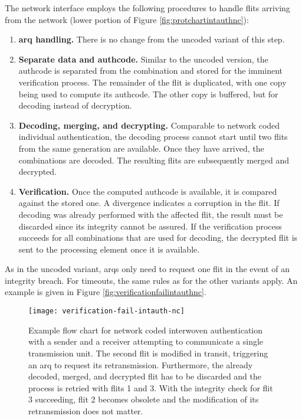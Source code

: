 The network interface employs the following procedures to handle flits arriving from the network (lower portion of Figure
\ref{fig:protchartintauthnc}):
\begin{enumerate}
    \item \textbf{\Gls{arq} handling.} There is no change from the uncoded variant of this step.
    \item \textbf{Separate data and authcode.} Similar to the uncoded version, the authcode is separated from the combination and stored for the
        imminent verification process. The remainder of the flit is duplicated, with one copy being used to compute its authcode. The other copy is
        buffered, but for decoding instead of decryption.
    \item \textbf{Decoding, merging, and decrypting.} Comparable to network coded individual authentication, the decoding process cannot start until
        two flits from the same generation are available. Once they have arrived, the combinations are decoded. The resulting flits are subsequently
        merged and decrypted.
    \item \textbf{Verification.} Once the computed authcode is available, it is compared against the stored one. A divergence indicates a corruption
        in the flit. If decoding was already performed with the affected flit, the result must be discarded since its integrity cannot be assured. If
        the verification process succeeds for all combinations that are used for decoding, the decrypted flit is sent to the processing element once
        it is available.
\end{enumerate}
\vspace{0.5\baselineskip}

As in the uncoded variant, \glspl{arq} only need to request one flit in the event of an integrity breach. For timeouts, the same rules as for the
other variants apply. An example is given in Figure \vref{fig:verificationfailintauthnc}.

\begin{figure}
    \centering
    \texttt{[image: verification-fail-intauth-nc]}
    \caption[Example flow chart for network coded int. auth. with integrity breach]{Example flow chart for network coded interwoven authentication
    with a sender and a receiver attempting to communicate a single transmission unit. The second flit is modified in transit, triggering an \gls{arq}
    to request its retransmission. Furthermore, the already decoded, merged, and decrypted flit has to be discarded and the process is retried with
    flits 1 and 3. With the integrity check for flit 3 succeeding, flit 2 becomes obsolete and the modification of its retransmission does not
    matter.}
    \label{fig:verificationfailintauthnc}
\end{figure}

